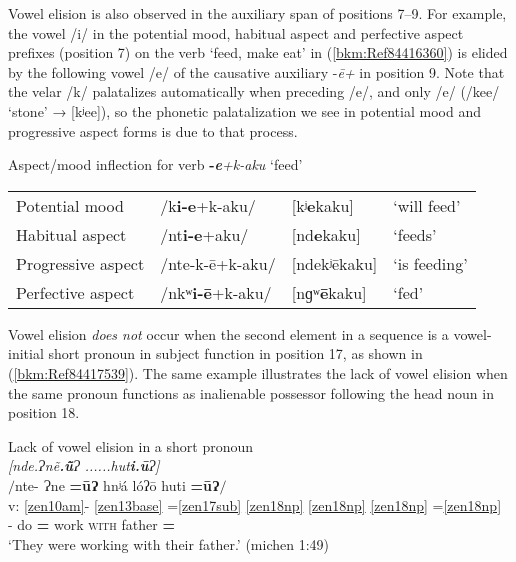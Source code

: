 \documentclass[output=paper]{langscibook}
\begin{document}
Vowel elision is also observed in the auxiliary span of positions 7{}--9. For example, the vowel /i/ in the potential mood, habitual aspect and perfective aspect prefixes (position 7) on the verb `feed, make eat' in (\ref{bkm:Ref84416360}) is elided by the following vowel /e/ of the causative auxiliary -\textit{ē+} in position 9. Note that the velar /k/ palatalizes automatically when preceding /e/, and only /e/ (/kee/ `stone' → [kʲee]), so the phonetic palatalization we see in potential mood and progressive aspect forms is due to that process.


\ea\label{bkm:Ref84416360}Aspect/mood inflection for verb \textbf{{}-}\textbf{\textit{e}}\textit{+k-aku} `feed' \\ 
    \begin{tabular}{llll}
        Potential mood      & /k\textbf{i-e}+k-aku/     & [kʲ\textbf{e}kaku]    & `will feed' \\
        Habitual aspect     & /nt\textbf{i-e}+aku/      & [nd\textbf{e}kaku]    & `feeds' \\
        Progressive aspect  & /nte-k-ē+k-aku/           & [ndekʲēkaku]     & `is feeding' \\
        Perfective aspect   & /nkʷ\textbf{i-ē}+k-aku/   & [nɡʷ\textbf{ē}kaku]  & `fed' \\
    \end{tabular}
\z

Vowel elision \textit{does not} occur when the second element in a sequence is a vowel-initial short pronoun in subject function in position 17, as shown in (\ref{bkm:Ref84417539}). The same example illustrates the lack of vowel elision when the same pronoun functions as inalienable possessor following the head noun in position 18.


\ea\label{bkm:Ref84417539}Lack of vowel elision in a short pronoun \\ 
\textit{[nde.Ɂnẽ\textbf{.\={\~{u}}}Ɂ  ......hut\textbf{i.ū}Ɂ]}\\
\glll {} $/$nte- Ɂne \textbf{=ūɁ} hnʲá lóʔō  huti \textbf{=ūɁ}$/$ \\
v: \ref{zen10am}{}- \ref{zen13base} =\ref{zen17sub} \ref{zen18np} \ref{zen18np} \ref{zen18np} =\ref{zen18np} \\
{} \Prog{}- do \textbf{=\Third\Pl{}} work \textsc{with} father \textbf{=\Third\Pl{}} \\
\glt `They were working with their father.' (michen 1:49)  
\z
\end{document}
